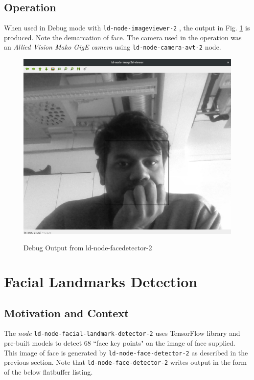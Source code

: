 \documentclass[a4paper, 12pt, oneside]{report}
\begin{document}
  \subsection{Operation}
  When used in Debug mode with \texttt{ld-node-imageviewer-2} \cite{Image2DViewerLinkDevelopersRFC-2020-01-16}, the output in Fig. \ref{fig:facedetectputput} is produced. Note the demarcation of face. The camera used in the operation was an \textit{Allied Vision Mako GigE camera} \cite{MakoGDocumentationAlliedVision-2020-02-12} using  \texttt{ld-node-camera-avt-2} \cite{NumericalAdvantageldnodecameraavt2ALink2nodetointerfacewithAlliedVisionMakoGmonochromemachinevisioncamera-2020-02-20} node.
  
  \begin{figure}[h]
      \caption{Debug Output from ld-node-facedetector-2}
      \centering
      \includegraphics[width=1\textwidth]{facedetectionoutput}
      \label{fig:facedetectputput}
  \end{figure}
  
  \section{Facial Landmarks Detection}
  
  \subsection{Motivation and Context}
  
  The \textit{node} \texttt{ld-node-facial-landmark-detector-2} \cite{NumericalAdvantageldnodefaciallandmarkdetector2ALink2nodetodetectfacialfeatures-2020-02-20} uses TensorFlow library and pre-built models to detect 68 ``face key points" on the image of face supplied. This image of face is generated by \texttt{ld-node-face-detector-2} \cite{NumericalAdvantageldnodefacedetector2ALink2nodetodetectfacesinastreamofvideo-2020-02-20} as described in the previous section. Note that \texttt{ld-node-face-detector-2} writes output in the form of the below flatbuffer \cite{FlatBuffersFlatBuffers-2019-06-20} listing. 
  
\end{document}

